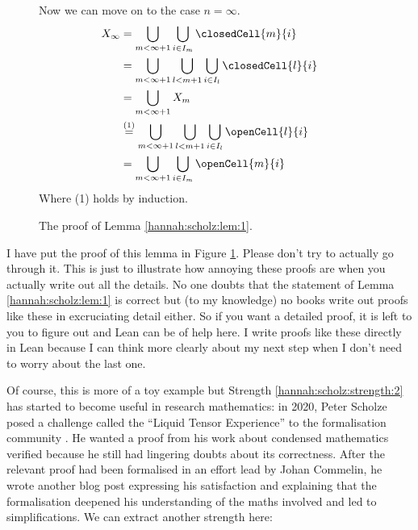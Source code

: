 \begin{figure}
\begin{framed}
\begin{minipage}[t]{0.4\linewidth}
    Now we can move on to the case $n = \infty$.
    \begin{equation*}
        \begin{split}
            X_{\infty} &= \bigcup_{m < \infty + 1}\bigcup_{i \in I_m}\closedCell{m}{i} \\
            &= \bigcup_{m < \infty + 1}\bigcup_{l < m + 1}\bigcup_{i \in I_l}\closedCell{l}{i} \\
            &= \bigcup_{m < \infty + 1} X_m \\
            &\stackrel{(1)}{=} \bigcup_{m < \infty + 1}\bigcup_{l < m + 1}\bigcup_{i \in I_l}\openCell{l}{i} \\
            &= \bigcup_{m < \infty + 1}\bigcup_{i \in I_m}\openCell{m}{i}
        \end{split}
    \end{equation*}
    Where (1) holds by induction.
        \end{minipage}
    \end{framed}
\caption{The proof of Lemma \ref{hannah:scholz:lem:1}.}
\label{hannah:scholz:fig:4}
\end{figure}

I have put the proof of this lemma in Figure \ref{hannah:scholz:fig:4}. Please don't try to actually go through it. This is just to illustrate how annoying these proofs are when you actually write out all the details. 
No one doubts that the statement of Lemma \ref{hannah:scholz:lem:1} is correct but (to my knowledge) no books write out proofs like these in excruciating detail either. So if you want a detailed proof, it is left to you to figure out and Lean can be of help here. I write proofs like these directly in Lean because I can think more clearly about my next step when I don't need to worry about the last one. 

Of course, this is more of a toy example but Strength \ref{hannah:scholz:strength:2} has started to become useful in research mathematics: in 2020, Peter Scholze posed a challenge called the ``Liquid Tensor Experience'' to the formalisation community \cite{LiquidTensor}. He wanted a proof from his work about condensed mathematics verified because he still had lingering doubts about its correctness. After the relevant proof had been formalised in an effort lead by Johan Commelin, he wrote another blog post \cite{LiquidTensor2} expressing his satisfaction and explaining that the formalisation deepened his understanding of the maths involved and led to simplifications. We can extract another strength here: 


